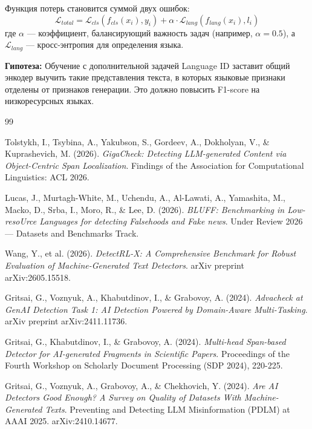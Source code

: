 \documentclass{article}
\begin{document}
Функция потерь становится суммой двух ошибок:
\begin{equation}
    \mathcal{L}_{total} = \mathcal{L}_{cls}(f_{cls}(x_i), y_i) + \alpha \cdot \mathcal{L}_{lang}(f_{lang}(x_i), l_i)
\end{equation}
где \(\alpha\) — коэффициент, балансирующий важность задач (например, \(\alpha = 0.5\)), а \(\mathcal{L}_{lang}\) — кросс-энтропия для определения языка.

\textbf{Гипотеза:} Обучение с дополнительной задачей Language ID заставит общий энкодер выучить такие представления текста, в которых языковые признаки отделены от признаков генерации. Это должно повысить F1-score на низкоресурсных языках.





\begin{thebibliography}{99}


Tolstykh, I., Tsybina, A., Yakubson, S., Gordeev, A., Dokholyan, V., \& Kuprashevich, M. (2026).
\textit{GigaCheck: Detecting LLM-generated Content via Object-Centric Span Localization}.
Findings of the Association for Computational Linguistics: ACL 2026.

Lucas, J., Murtagh-White, M., Uchendu, A., Al-Lawati, A., Yamashita, M., Macko, D., Srba, I., Moro, R., \& Lee, D. (2026).
\textit{BLUFF: Benchmarking in Low-resoUrce Languages for detecting Falsehoods and Fake news}.
Under Review 2026 --- Datasets and Benchmarks Track.

Wang, Y., et al. (2026).
\textit{DetectRL-X: A Comprehensive Benchmark for Robust Evaluation of Machine-Generated Text Detectors}.
arXiv preprint arXiv:2605.15518.


Gritsai, G., Voznyuk, A., Khabutdinov, I., \& Grabovoy, A. (2024).
\textit{Advacheck at GenAI Detection Task 1: AI Detection Powered by Domain-Aware Multi-Tasking}.
arXiv preprint arXiv:2411.11736.

Gritsai, G., Khabutdinov, I., \& Grabovoy, A. (2024).
\textit{Multi-head Span-based Detector for AI-generated Fragments in Scientific Papers}.
Proceedings of the Fourth Workshop on Scholarly Document Processing (SDP 2024), 220-225.

Gritsai, G., Voznyuk, A., Grabovoy, A., \& Chekhovich, Y. (2024).
\textit{Are AI Detectors Good Enough? A Survey on Quality of Datasets With Machine-Generated Texts}.
Preventing and Detecting LLM Misinformation (PDLM) at AAAI 2025. arXiv:2410.14677.


\end{thebibliography}
\end{document}
